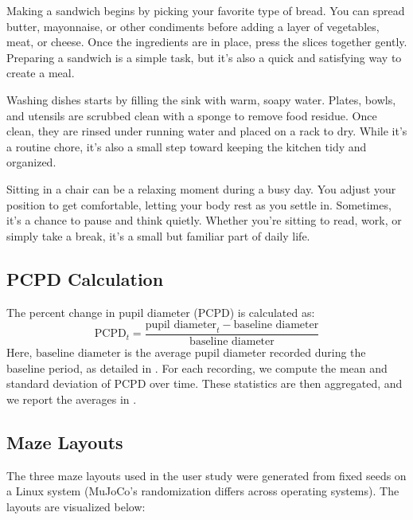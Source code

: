 \begin{small}
\begin{tcolorbox}[colback=gray!5, colframe=black!80, title=Text Before Method A (Teleoperation)]
Making a sandwich begins by picking your favorite type of bread. You can spread butter, mayonnaise, or other condiments before adding a layer of vegetables, meat, or cheese. Once the ingredients are in place, press the slices together gently. Preparing a sandwich is a simple task, but it’s also a quick and satisfying way to create a meal.
\end{tcolorbox}
\begin{tcolorbox}[colback=gray!5, colframe=black!80, title=Text Before Method B (Instruction-Following)]
Washing dishes starts by filling the sink with warm, soapy water. Plates, bowls, and utensils are scrubbed clean with a sponge to remove food residue. Once clean, they are rinsed under running water and placed on a rack to dry. While it’s a routine chore, it’s also a small step toward keeping the kitchen tidy and organized.
\end{tcolorbox}
\begin{tcolorbox}[colback=gray!5, colframe=black!80, title=Text Before Method C (IG-MCTS)]
Sitting in a chair can be a relaxing moment during a busy day. You adjust your position to get comfortable, letting your body rest as you settle in. Sometimes, it’s a chance to pause and think quietly. Whether you’re sitting to read, work, or simply take a break, it’s a small but familiar part of daily life.
\end{tcolorbox}
\end{small}

\subsection{PCPD Calculation}\label{appendix:pcpd_calculation}
The percent change in pupil diameter (PCPD) is calculated as:
\begin{equation}
    \text{PCPD}_t = \frac{\text{pupil diameter}_t - \text{baseline diameter}}{\text{baseline diameter}}
\end{equation}
Here, \( \text{baseline diameter} \) is the average pupil diameter recorded during the baseline period, as detailed in . For each recording, we compute the mean and standard deviation of PCPD over time. These statistics are then aggregated, and we report the averages in .

\newpage
\subsection{Maze Layouts}\label{appendix:maze_layouts}
The three maze layouts used in the user study were generated from fixed seeds on a Linux system (MuJoCo's randomization differs across operating systems). The layouts are visualized below:

